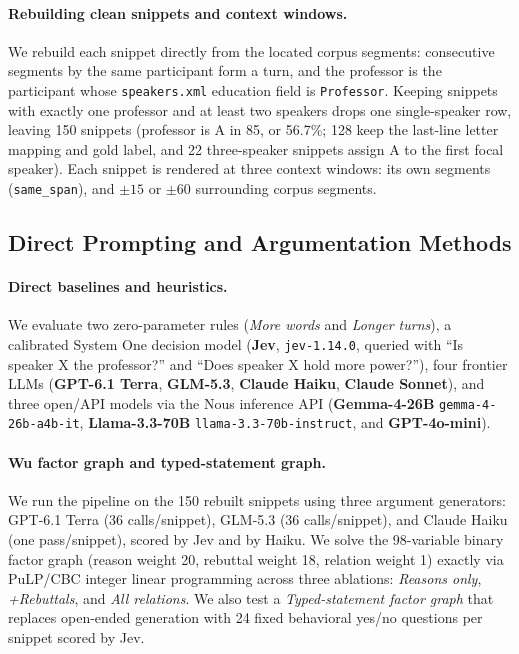 \documentclass[11pt]{article}
\begin{document}
\paragraph{Rebuilding clean snippets and context windows.}
We rebuild each snippet directly from the located corpus segments: consecutive segments by the same participant form a turn, and the professor is the participant whose \texttt{speakers.xml} education field is \texttt{Professor}.
Keeping snippets with exactly one professor and at least two speakers drops one single-speaker row, leaving 150 snippets (professor is A in 85, or 56.7\%; 128 keep the last-line letter mapping and gold label, and 22 three-speaker snippets assign A to the first focal speaker).
Each snippet is rendered at three context windows: its own segments (\texttt{same\_span}), and $\pm 15$ or $\pm 60$ surrounding corpus segments.

\subsection{Direct Prompting and Argumentation Methods}
\label{sec:method-models}

\paragraph{Direct baselines and heuristics.}
We evaluate two zero-parameter rules (\emph{More words} and \emph{Longer turns}), a calibrated System One decision model (\textbf{Jev}, \texttt{jev-1.14.0}, queried with ``Is speaker X the professor?'' and ``Does speaker X hold more power?''), four frontier LLMs (\textbf{GPT-6.1 Terra}, \textbf{GLM-5.3}, \textbf{Claude Haiku}, \textbf{Claude Sonnet}), and three open/API models via the Nous inference API (\textbf{Gemma-4-26B} \texttt{gemma-4-26b-a4b-it}, \textbf{Llama-3.3-70B} \texttt{llama-3.3-70b-instruct}, and \textbf{GPT-4o-mini}).

\paragraph{Wu factor graph and typed-statement graph.}
We run the \citet{wu2025power} pipeline on the 150 rebuilt snippets using three argument generators: GPT-6.1 Terra (36 calls/snippet), GLM-5.3 (36 calls/snippet), and Claude Haiku (one pass/snippet), scored by Jev and by Haiku.
We solve the 98-variable binary factor graph (reason weight 20, rebuttal weight 18, relation weight 1) exactly via PuLP/CBC integer linear programming across three ablations: \emph{Reasons only}, \emph{+Rebuttals}, and \emph{All relations}.
We also test a \emph{Typed-statement factor graph} that replaces open-ended generation with 24 fixed behavioral yes/no questions per snippet scored by Jev.
\end{document}
